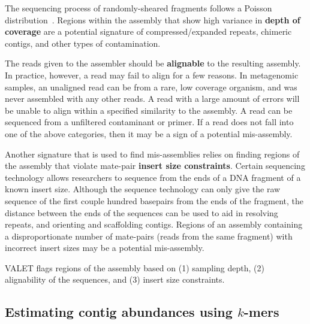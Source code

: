 \documentclass{bioinfo}
\begin{document}
The sequencing process of randomly-sheared fragments follows a Poisson distribution~\citep{lander1988genomic}.
Regions within the assembly that show high variance in \textbf{depth of coverage} are a potential signature of compressed/expanded repeats, chimeric contigs, and other types of contamination.

The reads given to the assembler should be \textbf{alignable} to the resulting assembly.
In practice, however, a read may fail to align for a few reasons.
In metagenomic samples, an unaligned read can be from a rare, low coverage organism, and was never assembled with any other reads.
A read with a large amount of errors will be unable to align within a specified similarity to the assembly.
A read can be sequenced from a unfiltered contaminant or primer.
If a read does not fall into one of the above categories, then it may be a sign of a potential mis-assembly.

Another signature that is used to find mis-assemblies relies on finding regions of the assembly that violate mate-pair \textbf{insert size constraints}.
Certain sequencing technology allows researchers to sequence from the ends of a DNA fragment of a known insert size.
Although the sequence technology can only give the raw sequence of the first couple hundred basepairs from the ends of the fragment, the distance between the ends of the sequences can be used to aid in resolving repeats, and orienting and scaffolding contigs.
Regions of an assembly containing a disproportionate number of mate-pairs (reads from the same fragment) with incorrect insert sizes may be a potential mis-assembly.

VALET flags regions of the assembly based on (1) sampling depth, (2) alignability of the sequences, and (3) insert size constraints.

\subsection{Estimating contig abundances using $k$-mers}
\end{document}
